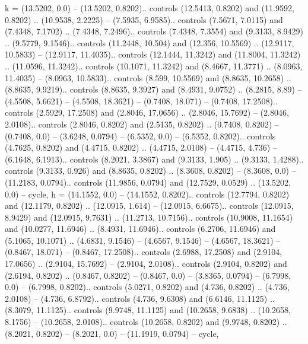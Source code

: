 {k} = {(13.5202, 0.0) -- (13.5202, 0.8202).. controls (12.5413, 0.8202) and (11.9592, 0.8202) .. (10.9538, 2.2225) -- (7.5935, 6.9585).. controls (7.5671, 7.0115) and (7.4348, 7.1702) .. (7.4348, 7.2496).. controls (7.4348, 7.3554) and (9.3133, 8.9429) .. (9.5779, 9.1546).. controls (11.2448, 10.504) and (12.356, 10.5569) .. (12.9117, 10.5833) -- (12.9117, 11.4035).. controls (12.1444, 11.3242) and (11.8004, 11.3242) .. (11.0596, 11.3242).. controls (10.1071, 11.3242) and (8.4667, 11.3771) .. (8.0963, 11.4035) -- (8.0963, 10.5833).. controls (8.599, 10.5569) and (8.8635, 10.2658) .. (8.8635, 9.9219).. controls (8.8635, 9.3927) and (8.4931, 9.0752) .. (8.2815, 8.89) -- (4.5508, 5.6621) -- (4.5508, 18.3621) -- (0.7408, 18.071) -- (0.7408, 17.2508).. controls (2.5929, 17.2508) and (2.8046, 17.0656) .. (2.8046, 15.7692) -- (2.8046, 2.0108).. controls (2.8046, 0.8202) and (2.5135, 0.8202) .. (0.7408, 0.8202) -- (0.7408, 0.0) -- (3.6248, 0.0794) -- (6.5352, 0.0) -- (6.5352, 0.8202).. controls (4.7625, 0.8202) and (4.4715, 0.8202) .. (4.4715, 2.0108) -- (4.4715, 4.736) -- (6.1648, 6.1913).. controls (8.2021, 3.3867) and (9.3133, 1.905) .. (9.3133, 1.4288).. controls (9.3133, 0.926) and (8.8635, 0.8202) .. (8.3608, 0.8202) -- (8.3608, 0.0) -- (11.2183, 0.0794).. controls (11.9856, 0.0794) and (12.7529, 0.0529) .. (13.5202, 0.0) -- cycle},
{h} = {(14.1552, 0.0) -- (14.1552, 0.8202).. controls (12.7794, 0.8202) and (12.1179, 0.8202) .. (12.0915, 1.614) -- (12.0915, 6.6675).. controls (12.0915, 8.9429) and (12.0915, 9.7631) .. (11.2713, 10.7156).. controls (10.9008, 11.1654) and (10.0277, 11.6946) .. (8.4931, 11.6946).. controls (6.2706, 11.6946) and (5.1065, 10.1071) .. (4.6831, 9.1546) -- (4.6567, 9.1546) -- (4.6567, 18.3621) -- (0.8467, 18.071) -- (0.8467, 17.2508).. controls (2.6988, 17.2508) and (2.9104, 17.0656) .. (2.9104, 15.7692) -- (2.9104, 2.0108).. controls (2.9104, 0.8202) and (2.6194, 0.8202) .. (0.8467, 0.8202) -- (0.8467, 0.0) -- (3.8365, 0.0794) -- (6.7998, 0.0) -- (6.7998, 0.8202).. controls (5.0271, 0.8202) and (4.736, 0.8202) .. (4.736, 2.0108) -- (4.736, 6.8792).. controls (4.736, 9.6308) and (6.6146, 11.1125) .. (8.3079, 11.1125).. controls (9.9748, 11.1125) and (10.2658, 9.6838) .. (10.2658, 8.1756) -- (10.2658, 2.0108).. controls (10.2658, 0.8202) and (9.9748, 0.8202) .. (8.2021, 0.8202) -- (8.2021, 0.0) -- (11.1919, 0.0794) -- cycle},
